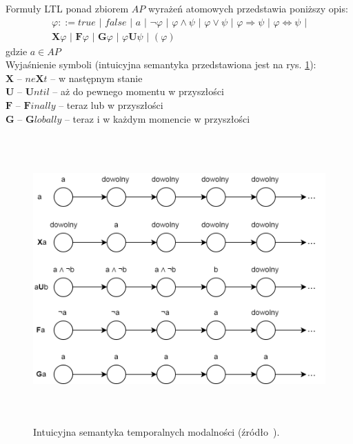 Formuły LTL ponad zbiorem $AP$ wyrażeń atomowych przedstawia poniższy opis:
\begin{gather}
\varphi::= true \,\, | \,\, false \,\, | \,\, a \,\, | \,\, \neg\varphi \,\, | \,\, \varphi \land \psi \,\, | \,\, \varphi \lor \psi \,\, | \,\, \varphi \Rightarrow \psi \,\, | \,\, \varphi \Leftrightarrow \psi \,\, | \nonumber\\
\mathbf{X}\varphi \,\, | \,\, \mathbf{F}\varphi \,\, | \,\, \mathbf{G}\varphi \,\, | \,\, \varphi\mathbf{U}\psi \,\, | \,\, (\varphi)\nonumber
\end{gather}
gdzie $a \in AP$ \\
Wyjaśnienie symboli (intuicyjna semantyka przedstawiona jest na rys. \ref{fig:ltl_semantics}): \\
$\mathbf{X}$ -- $ne\mathbf{X}t$ -- w następnym stanie \\
$\mathbf{U}$ -- $\mathbf{U}ntil$ -- aż do pewnego momentu w przyszłości \\
$\mathbf{F}$ -- $\mathbf{F}inally$ -- teraz lub w przyszłości \\
$\mathbf{G}$ -- $\mathbf{G}lobally$ -- teraz i w każdym momencie w przyszłości
\vspace{0.5cm}

\begin{figure}[h]
    \centering
    \includegraphics[height=11cm,keepaspectratio]{img/ltl_intuitive_semantics.png}
    \caption{Intuicyjna semantyka temporalnych modalności (źródło~\cite{Bai08}).}
    \label{fig:ltl_semantics}
\end{figure}

